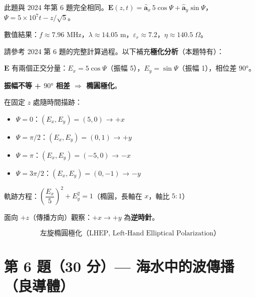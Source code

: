 \documentclass[12pt,a4paper]{article}
\newcommand{\vE}{\mathbf{E}}
\newcommand{\ax}{\hat{\mathbf{a}}_x}
\newcommand{\ay}{\hat{\mathbf{a}}_y}
\begin{document}
此題與 2024 年第 6 題完全相同。$\vE(z,t) = \ax\,5\cos\Psi + \ay\sin\Psi$，$\Psi = 5\times10^7 t - z/\sqrt{5}$。

數值結果：$f\approx 7.96$ MHz，$\lambda\approx 14.05$ m，$\varepsilon_r\approx 7.2$，$\eta\approx 140.5\;\Omega$。

請參考 2024 第 6 題的完整計算過程。以下補充\textbf{極化分析}（本題特有）：

\begin{solutionbox}[極化分析與圖示]

$\vE$ 有兩個正交分量：$E_x = 5\cos\Psi$（振幅 5），$E_y = \sin\Psi$（振幅 1），相位差 $90°$。

\textbf{振幅不等 + $90°$ 相差 $\Rightarrow$ 橢圓極化}。

在固定 $z$ 處隨時間描跡：
\begin{itemize}
  \item $\Psi = 0$：$(E_x, E_y) = (5, 0)$ → $+x$
  \item $\Psi = \pi/2$：$(E_x, E_y) = (0, 1)$ → $+y$
  \item $\Psi = \pi$：$(E_x, E_y) = (-5, 0)$ → $-x$
  \item $\Psi = 3\pi/2$：$(E_x, E_y) = (0, -1)$ → $-y$
\end{itemize}

軌跡方程：$\left(\dfrac{E_x}{5}\right)^2 + E_y^2 = 1$（橢圓，長軸在 $x$，軸比 $5:1$）

面向 $+z$（傳播方向）觀察：$+x \to +y$ 為\textbf{逆時針}。

\[
  \boxed{\text{左旋橢圓極化（LHEP, Left-Hand Elliptical Polarization）}}
\]
\end{solutionbox}

\section{第 6 題（30 分）— 海水中的波傳播（良導體）}
\end{document}

